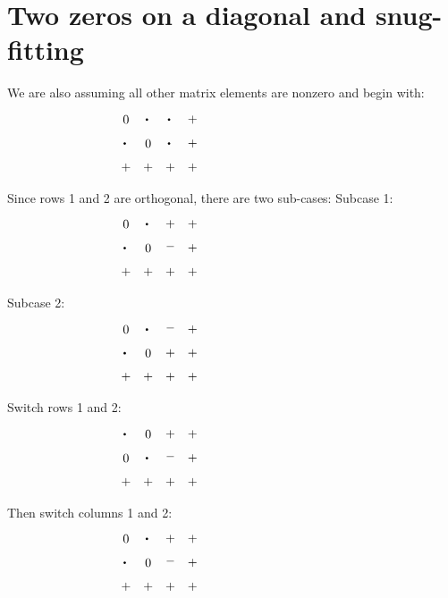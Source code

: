 \section*{Two zeros on a diagonal and snug-fitting}

We are also assuming all other matrix elements are nonzero and begin with:
\begin{equation*}
\myarrset
\begin{array}{cccc}
\ndcz & \ndcd & \ndcd & \ndcp \\
\ndcd & \ndcz & \ndsd & \ndcp \\
\ndsp & \ndcp & \ndcp & \ndsp
\end{array}
~~~~~~~~~~~~~~~~~~~~~~~~~~~~~~~~~~~
\end{equation*}
Since rows 1 and 2 are orthogonal, there are two sub-cases:
Subcase 1:
\begin{equation*}
\myarrset
\begin{array}{cccc}
\ndcz & \ndcd & \ndcp & \ndcp \\
\ndcd & \ndcz & \ndsm & \ndcp \\
\ndsp & \ndcp & \ndcp & \ndsp
\end{array}
~~~~~~~~~~~~~~~~~~~~~~~~~~~~~~~~~~~
\end{equation*}
Subcase 2:
\begin{equation*}
\myarrset
\begin{array}{cccc}
\ndcz & \ndcd & \ndcm & \ndcp \\
\ndcd & \ndcz & \ndsp & \ndcp \\
\ndsp & \ndcp & \ndcp & \ndsp
\end{array}
~~~~~~~~~~~~~~~~~~~~~~~~~~~~~~~~~~~
\end{equation*}
Switch rows 1 and 2:
\begin{equation*}
\myarrset
\begin{array}{cccc}
\ndcd & \ndcz & \ndsp & \ndcp \\
\ndcz & \ndcd & \ndcm & \ndcp \\
\ndsp & \ndcp & \ndcp & \ndsp
\end{array}
~~~~~~~~~~~~~~~~~~~~~~~~~~~~~~~~~~~
\end{equation*}
Then switch columns 1 and 2:
\begin{equation*}
\myarrset
\begin{array}{cccc}
\ndcz & \ndcd & \ndsp & \ndcp \\
\ndcd & \ndcz & \ndcm & \ndcp \\
\ndsp & \ndcp & \ndcp & \ndsp
\end{array}
~~~~~~~~~~~~~~~~~~~~~~~~~~~~~~~~~~~
\end{equation*}
